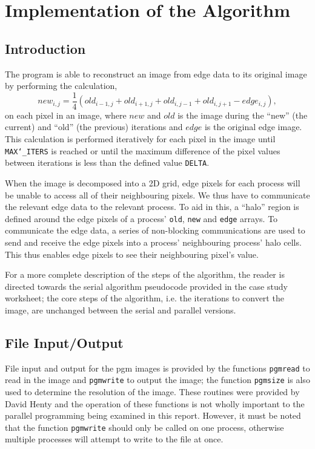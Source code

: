 \documentclass[11pt, a4paper]{article}
\begin{document}
	\section{Implementation of the Algorithm}
		\subsection{Introduction}
			The program is able to reconstruct an image from edge data to its original image by performing the calculation, $$ new_{i, j} = \frac{1}{4}(old_{i-1, j} + old_{i+1, j} + old_{i, j-1} + old_{i, j+1} - edge_{i, j}),$$ on each pixel in an image, where $new$ and $old$ is the image during the ``new'' (the current) and ``old'' (the previous) iterations and $edge$ is the original edge image. This calculation is performed iteratively for each pixel in the image until \texttt{MAX\char`_ITERS} is reached or until the maximum difference of the pixel values between iterations is less than the defined value \texttt{DELTA}.
			
			When the image is decomposed into a 2D grid, edge pixels for each process will be unable to access all of their neighbouring pixels. We thus have to communicate the relevant edge data to the relevant process. To aid in this, a ``halo'' region is defined around the edge pixels of a process' \texttt{old}, \texttt{new} and \texttt{edge} arrays. To communicate the edge data, a series of non-blocking communications are used to send and receive the edge pixels into a process' neighbouring process' halo cells. This thus enables edge pixels to see their neighbouring pixel's value.
			
			For a more complete description of the steps of the algorithm, the reader is directed towards the serial algorithm pseudocode provided in the case study worksheet; the core steps of the algorithm, i.e. the iterations to convert the image, are unchanged between the serial and parallel versions.
		
		\subsection{File Input/Output}
			File input and output for the pgm images is provided by the functions \texttt{pgmread} to read in the image and \texttt{pgmwrite} to output the image; the  function \texttt{pgmsize} is also used to determine the resolution of the image. These routines were provided by David Henty and the operation of these functions is not wholly important to the parallel programming being examined in this report. However, it must be noted that the function \texttt{pgmwrite} should only be called on one process, otherwise multiple processes will attempt to write to the file at once.
			
\end{document}
